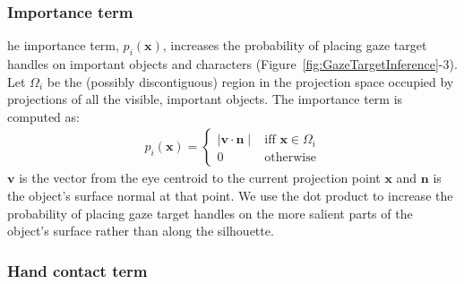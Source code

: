 \subsubsection{Importance term}

he importance term, $p_i(\mathbf{x})$, increases the probability of placing gaze target handles on important objects and characters (Figure~\ref{fig:GazeTargetInference}-3). Let $\Omega_i$ be the (possibly discontiguous) region in the projection space occupied by projections of all the visible, important objects. The importance term is computed as:
%
\begin{align} \label{eq:GazeImportanceProbability}
p_i(\mathbf{x}) =
\begin{cases}
\mid \mathbf{v} \cdot \mathbf{n} \mid & \text{iff } \mathbf{x} \in \Omega_i  \\
0 & \text{otherwise}
\end{cases}
\end{align}
%
$\mathbf{v}$ is the vector from the eye centroid to the current projection point $\mathbf{x}$ and $\mathbf{n}$ is the object's surface normal at that point. We use the dot product to increase the probability of placing gaze target handles on the more salient parts of the object's surface rather than along the silhouette.

\subsubsection{Hand contact term}

